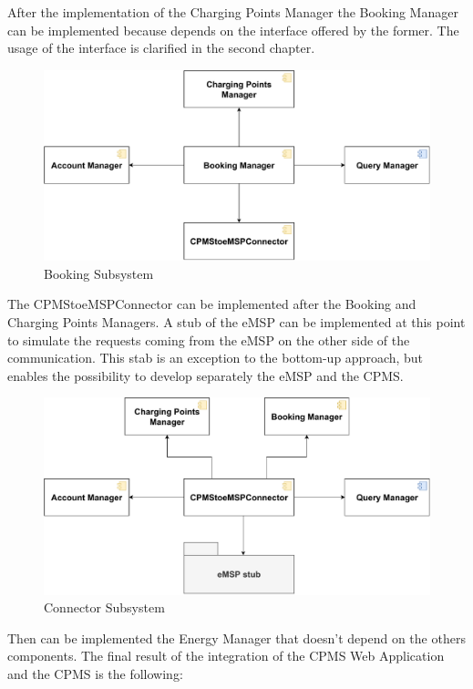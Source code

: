 After the implementation of the Charging Points Manager the Booking Manager can be implemented because depends on the interface offered by the former. 
The usage of the interface is clarified in the second chapter.
\begin{figure}[H]
    \centering
    \includegraphics[scale=0.6]{src/Integration/CPMS_Booking.pdf}
    \caption{Booking Subsystem}
\end{figure}
The CPMStoeMSPConnector can be implemented after the Booking and Charging Points Managers. A stub of the eMSP can be implemented at this point to simulate
the requests coming from the eMSP on the other side of the communication. This stab is an exception to the bottom-up approach, but
enables the possibility to develop separately the eMSP and the CPMS. 
\begin{figure}[H]
    \centering
    \includegraphics[scale=0.6]{src/Integration/CPMS_Connector.pdf}
    \caption{Connector Subsystem}
\end{figure}
Then can be implemented the Energy Manager that doesn't depend on the others components. 
The final result of the integration of the CPMS Web Application and the CPMS is the following:
